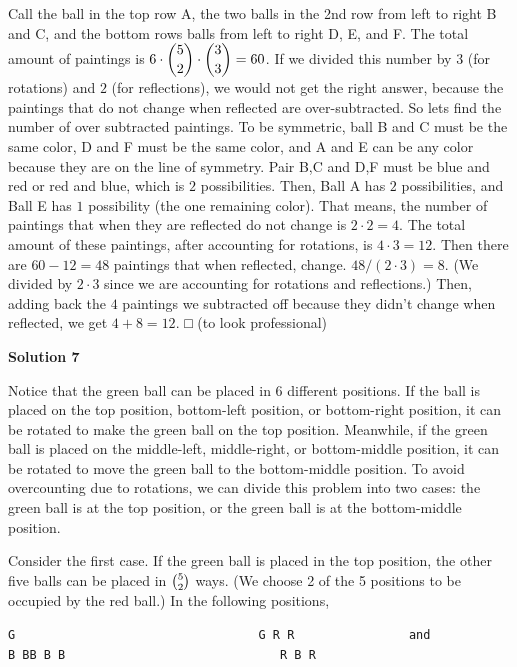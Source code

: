 \begin{enumerate}
Call the ball in the top row A, the two balls in the 2nd row from left to right B and C, and the bottom rows balls from left to right D, E, and F. The total amount of paintings is $6 \cdot \dbinom{5}{2} \cdot \dbinom{3}{3} = 60$. If we divided this number by $3$ (for rotations) and $2$ (for reflections), we would not get the right answer, because the paintings that do not change when reflected are over-subtracted. So lets find the number of over subtracted paintings. To be symmetric, ball B and C must be the same color, D and F must be the same color, and A and E can be any color because they are on the line of symmetry. Pair B,C and D,F must be blue and red or red and blue, which is $2$ possibilities. Then, Ball A has $2$ possibilities, and Ball E has $1$ possibility (the one remaining color). That means, the number of paintings that when they are reflected do not change is $2 \cdot 2 = 4.$ The total amount of these paintings, after accounting for rotations, is $4 \cdot 3 = 12.$ Then there are $60 - 12 = 48$ paintings that when reflected, change. $48/(2 \cdot 3) = 8.$ (We divided by $2 \cdot 3$ since we are accounting for rotations and reflections.) Then, adding back the $4$ paintings we subtracted off because they didn't change when reflected, we get $4 + 8 = 12.$ □ (to look professional)

 



\textbf{Solution 7}

Notice that the green ball can be placed in 6 different positions. If the ball is placed on the top position, bottom-left position, or bottom-right position, it can be rotated to make the green ball on the top position. Meanwhile, if the green ball is placed on the middle-left, middle-right, or bottom-middle position, it can be rotated to move the green ball to the bottom-middle position. To avoid overcounting due to rotations, we can divide this problem into two cases: the green ball is at the top position, or the green ball is at the bottom-middle position.

 Consider the first case. If the green ball is placed in the top position, the other five balls can be placed in $\tbinom{5}{2}$ ways. (We choose 2 of the 5 positions to be occupied by the red ball.) In the following positions,

 \begin{verbatim}
G                                  G R R                and             B BB B B                              R B R
\end{verbatim}


\end{enumerate}
